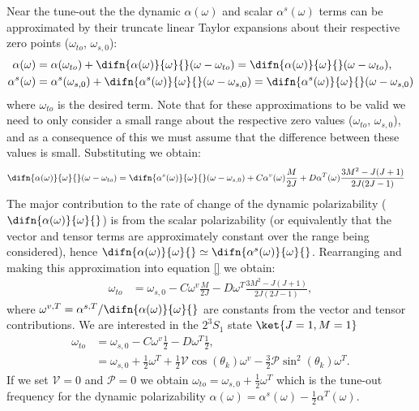 	Near the tune-out the the dynamic \(\alpha(\omega)\) and scalar \(\alpha^s(\omega)\) terms can be approximated by their truncate linear Taylor expansions about their respective zero points (\(\omega_{to}\), \(\omega_{s,0}\)):
	\begin{align}
	    \alpha(\omega) &= \alpha(\omega_{to}) + \difn{\alpha(\omega)}{\omega}{{}}(\omega-\omega_{to})=\difn{\alpha(\omega)}{\omega}{{}}(\omega-\omega_{to}), \\
	    \alpha^s(\omega) &= \alpha^s(\omega_{s,0}) + \difn{\alpha^s(\omega)}{\omega}{{}}(\omega-\omega_{s,0})= \difn{\alpha^s(\omega)}{\omega}{{}}(\omega-\omega_{s,0})
	\end{align}
	where \(\omega_{to}\) is the desired term. Note that for these approximations to be valid we need to only consider a small range about the respective zero values (\(\omega_{to}\), \(\omega_{s,0}\)), and as a consequence of this we must assume that the difference between these values is small. Substituting we obtain:
	\begin{align}
	    \difn{\alpha(\omega)}{\omega}{{}}(\omega-\omega_{to}) &= \difn{\alpha^s(\omega)}{\omega}{{}}(\omega-\omega_{s,0}) + C \alpha^v(\omega) \frac{M}{2J} + D \alpha^T(\omega) \frac{3M^2-J(J+1)}{2J(2J-1)}
	\end{align}
	The major contribution to the rate of change of the dynamic polarizability (\(\difn{\alpha(\omega)}{\omega}{{}}\)) is from the scalar polarizability (or equivalently that the vector and tensor terms are approximately constant over the range being considered), hence \(\difn{\alpha(\omega)}{\omega}{{}} \simeq \difn{\alpha^s(\omega)}{\omega}{{}}\). Rearranging and making this approximation into equation \ref{} we obtain:
	\begin{align}
	    \omega_{to} &= \omega_{s,0} - C \omega^v \frac{M}{2J} - D \omega^T \frac{3M^2-J(J+1)}{2J(2J-1)},
	\end{align}
	where \(\omega^{v,T} = \alpha^{s,T}/\difn{\alpha(\omega)}{\omega}{{}}\) are constants from the vector and tensor contributions. We are interested in the \(2^3S_1\) state \(\ket{J=1,M=1}\)
	\begin{align}
	    \omega_{to} &= \omega_{s,0} - C \omega^v \frac{1}{2} - D \omega^T \frac{1}{2},\\
	    &= \omega_{s,0} + \frac{1}{2} \omega^T + \frac{1}{2} \mathcal{V} \cos \left( \theta_k \right) \omega^v - \frac{3}{2} \mathcal{P} \sin^2(\theta_k) \omega^T.
	\end{align}
	If we set \(\mathcal{V}=0\) and \(\mathcal{P}=0\) we obtain \(\omega_{to} = \omega_{s,0} + \frac{1}{2} \omega^T\) which is the tune-out frequency for the dynamic polarizability \(\alpha(\omega) = \alpha^s(\omega) - \frac{1}{2}  \alpha^T(\omega)\).


